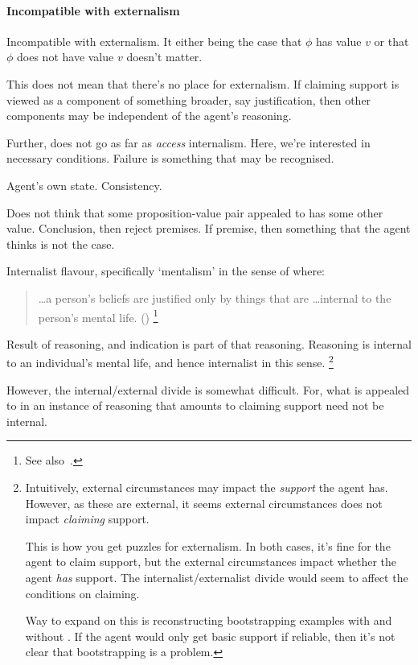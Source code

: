 \paragraph{Incompatible with externalism}

\begin{note}
  Incompatible with externalism.
  It either being the case that \(\phi\) has value \(v\) or that \(\phi\) does not have value \(v\) doesn't matter.

  This does not mean that there's no place for externalism.
  If claiming support is viewed as a component of something broader, say justification, then other components may be independent of the agent's reasoning.

  Further, does not go as far as \emph{access} internalism.
  Here, we're interested in necessary conditions.
  Failure is something that may be recognised.
\end{note}

\begin{note}
  Agent's own state.
  Consistency.

  Does not think that some proposition-value pair appealed to has some other value.
  Conclusion, then reject premises.
  If premise, then something that the agent thinks is not the case.
\end{note}

\begin{note}
  \color{red}
  Internalist flavour, specifically `mentalism' in the sense of \citeauthor{Feldman:2001uy} where:
  \begin{quote}
    \dots a person's beliefs are justified only by things that are \dots internal to the person's mental life.\nolinebreak
    \mbox{}\hfill\mbox{(\citeyear[233]{Feldman:2001uy})}\nolinebreak
    \footnote{
      See also~\textcite[\S4,9]{Pappas:2017vi}.
    }
  \end{quote}
  Result of reasoning, and indication is part of that reasoning.
  Reasoning is internal to an individual's mental life, and hence internalist in this sense.\nolinebreak
  \footnote{
    \color{red}
    Intuitively, external circumstances may impact the \emph{support} the agent has.
    However, as these are external, it seems external circumstances does not impact \emph{claiming} support.

    This is how you get puzzles for externalism.
    In both cases, it's fine for the agent to claim support, but the external circumstances impact whether the agent \emph{has} support.
    The internalist/externalist divide would seem to affect the conditions on claiming.

    Way to expand on this is reconstructing bootstrapping examples with and without \eiS{}.
    If the agent would only get basic support if reliable, then it's not clear that bootstrapping is a problem.
  }

  However, the internal/external divide is somewhat difficult.
  For, what is appealed to in an instance of reasoning that amounts to claiming support need not be internal.
\end{note}

